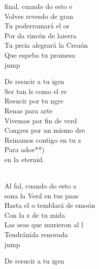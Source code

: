 \begin{cancion}%
	 final, cuando do esto e \\
	Volves revesdo de gran  \\
	Tu poderramará el or\\
	Por da rincón de laierra\\
	Tu prcia alegrará la Creaón\\
	Que espeba tu promesa\\jump\\
	\begin{chorus}%
	De resucir a tu igen\\
	Ser tan ls como el re\\
	Resucir por tu ngre\\
	Renas para arte\\
	Vivemos por fin de verd\\
	Congres por un mismo dre\\
	Reinamos contigo en tu z\\
	Para adoe**)\\
	en la eternid.\\
	\end{chorus}%
	\jump\\
	Al fal, cuando do esto a  \\
	sona la Verd en tus paas \\
	Hasta el o temblará de emoón\\
	Con la z de tu mida\\
	Las seas que murieron al l\\
	Tendránida renovada\\jump\\
	\begin{chorus}%
	De resucir a tu igen\\

\end{chorus}
\end{cancion}
